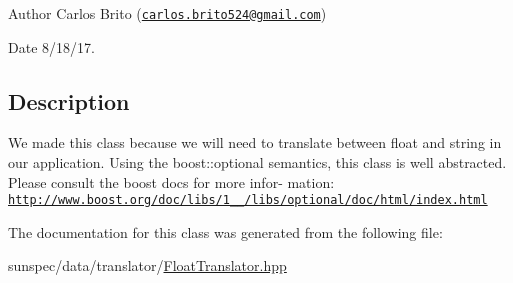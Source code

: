 \begin{DoxyAuthor}{Author}
Carlos Brito (\href{mailto:carlos.brito524@gmail.com}{\tt carlos.\+brito524@gmail.\+com}) 
\end{DoxyAuthor}
\begin{DoxyDate}{Date}
8/18/17.
\end{DoxyDate}
\subsection*{Description}

We made this class because we will need to translate between {\ttfamily float} and {\ttfamily string} in our application. Using the {\ttfamily boost\+::optional} semantics, this class is well abstracted. Please consult the {\ttfamily boost} docs for more infor-\/ mation\+: \href{http://www.boost.org/doc/libs/1_64_0/libs/optional/doc/html/index.html}{\tt http\+://www.\+boost.\+org/doc/libs/1\+\_\+\_/libs/optional/doc/html/index.\+html} 

The documentation for this class was generated from the following file\+:\begin{DoxyCompactItemize}
\item 
sunspec/data/translator/\hyperlink{_float_translator_8hpp}{Float\+Translator.\+hpp}\end{DoxyCompactItemize}

